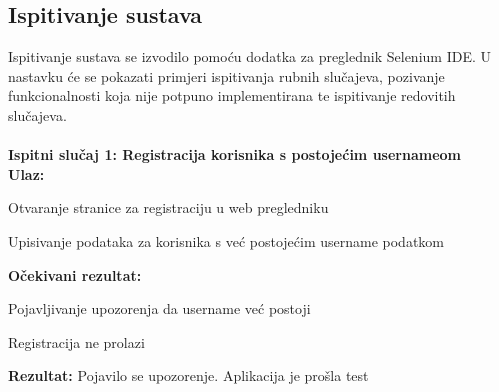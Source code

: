 			
			
			\subsection{Ispitivanje sustava}
			
			Ispitivanje sustava se izvodilo pomoću dodatka za preglednik Selenium IDE. U nastavku će se pokazati primjeri ispitivanja rubnih slučajeva, pozivanje funkcionalnosti koja nije potpuno implementirana te ispitivanje redovitih slučajeva.\\\\
			
			\textbf{Ispitni slučaj 1: Registracija korisnika s postojećim usernameom}
			\text{}\\
			
			\textbf{Ulaz:}
			
			\begin{packed_enum}
				\item{Otvaranje stranice za registraciju u web pregledniku}
				\item{Upisivanje podataka za korisnika s već postojećim username podatkom}
			\end{packed_enum}
		
			\textbf{Očekivani rezultat:}
			
			\begin{packed_enum}
				\item{Pojavljivanje upozorenja da username već postoji}
				\item{Registracija ne prolazi}
			\end{packed_enum}
		
			\textbf{Rezultat:} Pojavilo se upozorenje. Aplikacija je prošla test
			
